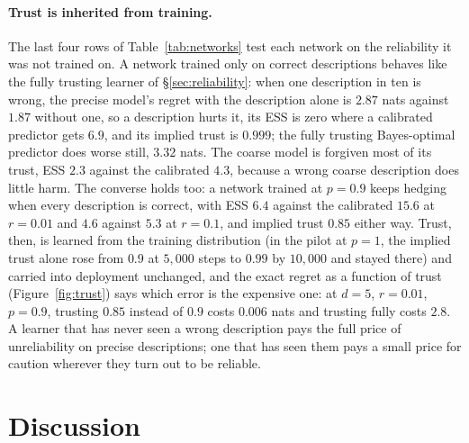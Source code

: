 \documentclass[10pt]{article}
\begin{document}
\paragraph{Trust is inherited from training.}
The last four rows of Table~\ref{tab:networks} test each network on the reliability it was not trained on. A network trained only on correct descriptions behaves like the fully trusting learner of \S\ref{sec:reliability}: when one description in ten is wrong, the precise model's regret with the description alone is $2.87$ nats against $1.87$ without one, so a description hurts it, its ESS is zero where a calibrated predictor gets $6.9$, and its implied trust is $0.999$; the fully trusting Bayes-optimal predictor does worse still, $3.32$ nats. The coarse model is forgiven most of its trust, ESS $2.3$ against the calibrated $4.3$, because a wrong coarse description does little harm. The converse holds too: a network trained at $p = 0.9$ keeps hedging when every description is correct, with ESS $6.4$ against the calibrated $15.6$ at $r = 0.01$ and $4.6$ against $5.3$ at $r = 0.1$, and implied trust $0.85$ either way. Trust, then, is learned from the training distribution (in the pilot at $p = 1$, the implied trust alone rose from $0.9$ at $5{,}000$ steps to $0.99$ by $10{,}000$ and stayed there) and carried into deployment unchanged, and the exact regret as a function of trust (Figure~\ref{fig:trust}) says which error is the expensive one: at $d = 5$, $r = 0.01$, $p = 0.9$, trusting $0.85$ instead of $0.9$ costs $0.006$ nats and trusting fully costs $2.8$. A learner that has never seen a wrong description pays the full price of unreliability on precise descriptions; one that has seen them pays a small price for caution wherever they turn out to be reliable.

\section{Discussion}
\end{document}
